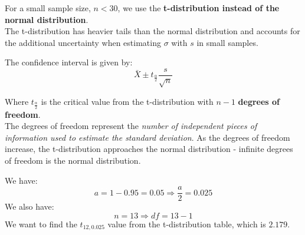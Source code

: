 \documentclass[a4paper, 10pt]{article}
\begin{document}
\begin{definitionbox}
    For a small sample size, $n < 30$, we use the \textbf{t-distribution instead of the normal distribution}. \\
    The t-distribution has heavier tails than the normal distribution and accounts for the additional uncertainty when estimating $\sigma$ with $s$ in small samples.

    The confidence interval is given by:
    $$\bar{X} \pm t_{\frac{\alpha}{2}} \frac{s}{\sqrt{n}}$$

    Where $t_{\frac{\alpha}{2}}$ is the critical value from the t-distribution with $n-1$ \textbf{degrees of freedom}. \\
    The degrees of freedom represent the \emph{number of independent pieces of information used to estimate the standard deviation}.
    As the degrees of freedom increase, the t-distribution approaches the normal distribution - infinite degrees of freedom is the normal distribution.

    \begin{center}
    \end{center}
\end{definitionbox}

\begin{examplebox}
    We have:
    $$a = 1 - 0.95 = 0.05 \Rightarrow \frac{a}{2} = 0.025$$
    We also have:
    $$n = 13 \Rightarrow df = 13 - 1$$
    We want to find the $t_{12, 0.025}$ value from the t-distribution table, which is $2.179$.
\end{examplebox}
\end{document}

